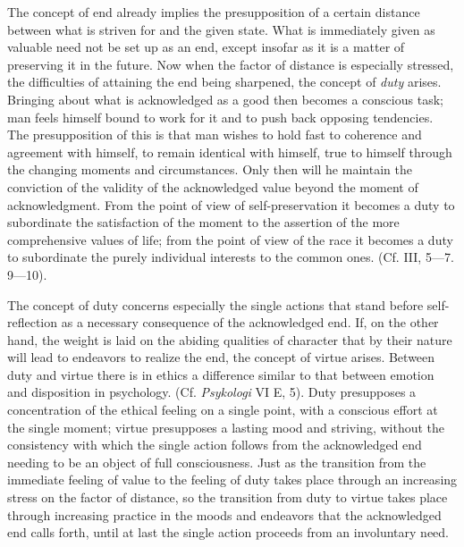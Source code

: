 \documentclass[12pt,a4paper,openany]{book}
\newcommand{\opage}[1]{\marginnote{\footnotesize\textit{[#1]}}}
\begin{document}
The concept of end already implies the presupposition of a certain distance between what is striven for
and the given state. What is immediately given as valuable need not be set up as an end, except insofar as
it is a matter of preserving it in the future. Now when the factor of distance is especially stressed, the
difficulties of attaining the end being sharpened, the concept of \textit{duty} arises. Bringing about what
is acknowledged as a good then becomes a conscious task; man feels himself bound to work for it and to push
back opposing tendencies. The presupposition of this is that man wishes to hold fast to coherence and
agreement with himself, to remain identical with himself, true to himself through the changing moments and
circumstances. Only then will he maintain the conviction of the validity of the acknowledged value beyond
the moment of acknowledgment.
\opage{156}From the point of view of self-preservation it becomes a duty to subordinate the satisfaction of the
moment to the assertion of the more comprehensive values of life; from the point of view of the race it
becomes a duty to subordinate the purely individual interests to the common ones. (Cf. III, 5---7.
9---10).

The concept of duty concerns especially the single actions that stand before self-reflection as a
necessary consequence of the acknowledged end. If, on the other hand, the weight is laid on the abiding
qualities of character that by their nature will lead to endeavors to realize the end, the concept of
virtue arises. Between duty and virtue there is in ethics a difference similar to that between emotion and
disposition in psychology. (Cf. \textit{Psykologi} VI E, 5). Duty presupposes a concentration of the ethical
feeling on a single point, with a conscious effort at the single moment; virtue presupposes a lasting mood
and striving, without the consistency with which the single action follows from the acknowledged end
needing to be an object of full consciousness. Just as the transition from the immediate feeling of value
to the feeling of duty takes place through an increasing stress on the factor of distance, so the
transition from duty to virtue takes place through increasing practice in the moods and endeavors that the
acknowledged end calls forth, until at last the single action proceeds from an involuntary need.
\end{document}

